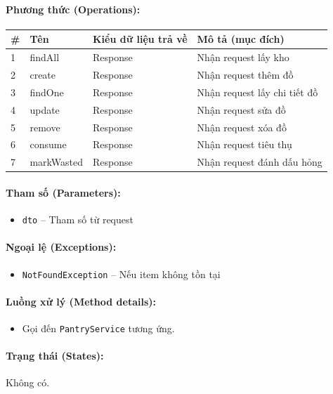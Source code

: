 \documentclass[12pt,a4paper]{article}
\begin{document}
\paragraph{Phương thức (Operations):}
\begin{longtable}{|p{0.6cm}|p{3.8cm}|p{2.6cm}|p{6.5cm}|}
\hline
\textbf{\#} & \textbf{Tên} & \textbf{Kiểu dữ liệu trả về} & \textbf{Mô tả (mục đích)} \\ \hline
\endhead
1 & findAll & Response & Nhận request lấy kho \\ \hline
2 & create & Response & Nhận request thêm đồ \\ \hline
3 & findOne & Response & Nhận request lấy chi tiết đồ \\ \hline
4 & update & Response & Nhận request sửa đồ \\ \hline
5 & remove & Response & Nhận request xóa đồ \\ \hline
6 & consume & Response & Nhận request tiêu thụ \\ \hline
7 & markWasted & Response & Nhận request đánh dấu hỏng \\ \hline
\end{longtable}

\paragraph{Tham số (Parameters):}
\begin{itemize}[leftmargin=*]
    \item \texttt{dto} – Tham số từ request
\end{itemize}


\paragraph{Ngoại lệ (Exceptions):}
\begin{itemize}[leftmargin=*]
    \item \texttt{NotFoundException} – Nếu item không tồn tại
\end{itemize}


\paragraph{Luồng xử lý (Method details):}
\begin{itemize}[leftmargin=*]
    \item Gọi đến \texttt{PantryService} tương ứng.
\end{itemize}


\paragraph{Trạng thái (States):}
Không có.
\end{document}
